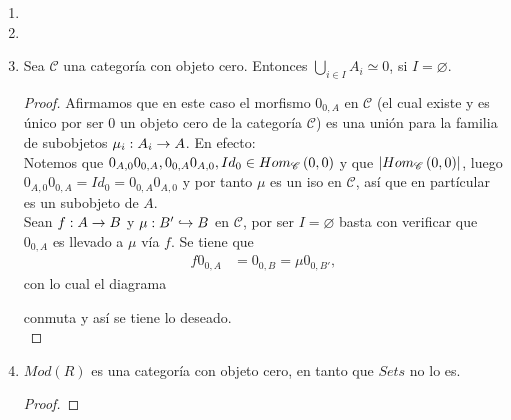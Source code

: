 \documentclass{article}
\begin{document}
\begin{enumerate}[label=\textbf{Ej \arabic*.}]
\begin{proof}
			 conmuta, luego $\delta'$ es tal que $\gamma_1=\beta_1\delta'$ y 
			\begin{equation*}
				\mu\gamma_2=\lrprth{\mu f'}\delta'=\beta_2\delta'.
			\end{equation*}
			Por lo tantto, aplicando la propiedad universal del pull-back a (\ref{pborig}) se tiene que $\delta'=\delta$, con lo cual  se tien que existe un único morfismo $\delta$ tal que el siguiente diagrama conmuta
			\begin{center}
				,
			\end{center}	
		i.e. (\ref{pdpb}) es un pull-back y así se tiene lo deseado.\\
		\end{proof}
		\item
		\item
		\item Sea $\mathscr{C}$ una categoría con objeto cero. Entonces $\bigcup\limits_{i\in I}A_i\simeq 0$, si $I=\varnothing$.
		\begin{proof}
			Afirmamos que en este caso el morfismo $0_{0,A}$  en $\mathscr{C}$ (el cual existe y es único por ser $0$ un objeto cero de la categoría $\mathscr{C}$) es una unión para la familia de subobjetos $\catarrow{\mu_i}{A_i}{A}{}$. En efecto:\\
			Notemos que $0_{A,0}0_{0,A},0_{0,A}0_{A,0},  Id_0\in Hom_{\mathscr{C}}\left(0,0\right)$ y que $\left|Hom_{\mathscr{C}}\left(0,0\right)\right|$, luego $0_{A,0}0_{0,A}=Id_0=0_{0,A}0_{A,0}$ y por tanto $\mu$ es un iso en $\mathscr{C}$, así que en partícular es un subobjeto de $A$.\\
			Sean $\catarrow{f}{A}{B}{}$ y $\catarrow{\mu}{B'}{B}{m}$ en $\mathscr{C}$, por ser $I=\varnothing$ basta con verificar que $0_{0,A}$ es llevado a $\mu$ vía $f$. Se tiene que
			\begin{align*}
				f0_{0,A}&=0_{0,B}=\mu 0_{0,B'},
			\end{align*}
			con lo cual el diagrama
			\begin{center}
			\end{center}
		conmuta y así se tiene lo deseado.\\
		\end{proof}
		\item $Mod(R)$ es una categoría con objeto cero, en tanto que $Sets$ no lo es.
		\begin{proof}

\end{proof}
\end{enumerate}
\end{document}
